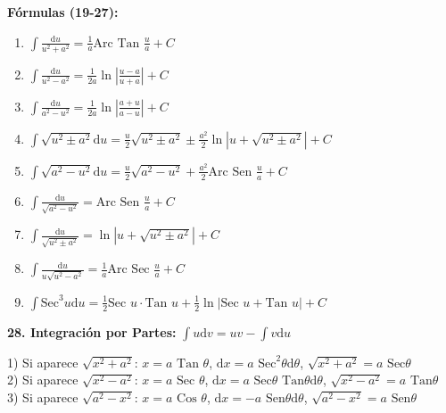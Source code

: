 \documentclass[10pt, letterpaper, landscape]{article}
\newcommand{\ds}{\displaystyle}
\newcommand{\dd}{\mathrm{d}}
\begin{document}
\begin{minipage}[t]{8.3cm}
    \textbf{Fórmulas (19-27):}
    \begin{enumerate}[label=\arabic*., start=19, nosep, itemsep=1pt, leftmargin=15pt]
        \item $\int \frac{\dd u}{u^2 + a^2} = \frac{1}{a} \text{Arc Tan } \frac{u}{a} + C$
        \item $\int \frac{\dd u}{u^2 - a^2} = \frac{1}{2a} \ln\left|\frac{u-a}{u+a}\right| + C$
        \item $\int \frac{\dd u}{a^2 - u^2} = \frac{1}{2a} \ln\left|\frac{a+u}{a-u}\right| + C$
        \item $\int \sqrt{u^2 \pm a^2} \dd u = \frac{u}{2}\sqrt{u^2 \pm a^2} \pm \frac{a^2}{2}\ln|u + \sqrt{u^2 \pm a^2}| + C$
        \item $\int \sqrt{a^2 - u^2} \dd u = \frac{u}{2}\sqrt{a^2 - u^2} + \frac{a^2}{2}\text{Arc Sen } \frac{u}{a} + C$
        \item $\int \frac{\dd u}{\sqrt{a^2 - u^2}} = \text{Arc Sen } \frac{u}{a} + C$
        \item $\int \frac{\dd u}{\sqrt{u^2 \pm a^2}} = \ln|u + \sqrt{u^2 \pm a^2}| + C$
        \item $\int \frac{\dd u}{u\sqrt{u^2 - a^2}} = \frac{1}{a} \text{Arc Sec } \frac{u}{a} + C$
        \item $\int \text{Sec}^3 u \dd u = \frac{1}{2}\text{Sec } u \cdot \text{Tan } u + \frac{1}{2}\ln|\text{Sec } u + \text{Tan } u| + C$
    \end{enumerate}

    \vspace{0.15cm}
    \textbf{28. Integración por Partes:} $\ds \int u \dd v = uv - \int v \dd u$

    \vspace{0.15cm}
    \begin{tcolorbox}[colback=white, colframe=black, boxrule=0.5pt, arc=0pt, auto outer arc, left=2pt, right=2pt, top=2pt, bottom=2pt, boxsep=1pt, before=\vspace{4pt}, after=\vspace{4pt}, title=\footnotesize Sustitución Trigonométrica]
        {\scriptsize
        1) Si aparece $\sqrt{x^2+a^2}$:
        $x = a \text{ Tan } \theta$, $\dd x = a \text{ Sec}^2 \theta \dd\theta$, $\sqrt{x^2+a^2} = a \text{ Sec}\theta$ \\
        2) Si aparece $\sqrt{x^2-a^2}$:
        $x = a \text{ Sec } \theta$, $\dd x = a \text{ Sec}\theta \text{ Tan}\theta \dd\theta$, $\sqrt{x^2-a^2} = a \text{ Tan}\theta$ \\
        3) Si aparece $\sqrt{a^2-x^2}$:
        $x = a \text{ Cos } \theta$, $\dd x = -a \text{ Sen}\theta \dd\theta$, $\sqrt{a^2-x^2} = a \text{ Sen}\theta$
        }
    \end{tcolorbox}


\end{minipage}
\end{document}
